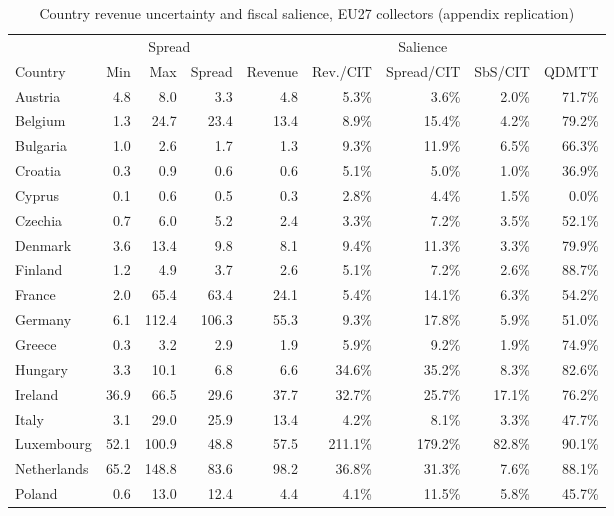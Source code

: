 \begin{table}[H]
\centering
\scriptsize
\setlength{\tabcolsep}{2pt}
\caption[Country revenue uncertainty and fiscal salience, EU27 collectors]{Country revenue uncertainty and fiscal salience, EU27 collectors (appendix replication)}
\label{tab:app_country_revenue_diagnostic}
\begin{adjustbox}{max width=\textwidth,center}
\begin{tabular}{@{}l rrr r rrrr@{}}
\toprule
 & \multicolumn{3}{c}{Spread} & \multicolumn{5}{c}{Salience} \\
\cmidrule(lr){2-4} \cmidrule(lr){5-9}
Country & Min & Max & Spread & Revenue & Rev./CIT & Spread/CIT & SbS/CIT & QDMTT \\
\midrule
Austria & 4.8 & 8.0 & 3.3 & 4.8 & 5.3\% & 3.6\% & 2.0\% & 71.7\% \\
Belgium & 1.3 & 24.7 & 23.4 & 13.4 & 8.9\% & 15.4\% & 4.2\% & 79.2\% \\
Bulgaria & 1.0 & 2.6 & 1.7 & 1.3 & 9.3\% & 11.9\% & 6.5\% & 66.3\% \\
Croatia & 0.3 & 0.9 & 0.6 & 0.6 & 5.1\% & 5.0\% & 1.0\% & 36.9\% \\
Cyprus & 0.1 & 0.6 & 0.5 & 0.3 & 2.8\% & 4.4\% & 1.5\% & 0.0\% \\
Czechia & 0.7 & 6.0 & 5.2 & 2.4 & 3.3\% & 7.2\% & 3.5\% & 52.1\% \\
Denmark & 3.6 & 13.4 & 9.8 & 8.1 & 9.4\% & 11.3\% & 3.3\% & 79.9\% \\
Finland & 1.2 & 4.9 & 3.7 & 2.6 & 5.1\% & 7.2\% & 2.6\% & 88.7\% \\
France & 2.0 & 65.4 & 63.4 & 24.1 & 5.4\% & 14.1\% & 6.3\% & 54.2\% \\
Germany & 6.1 & 112.4 & 106.3 & 55.3 & 9.3\% & 17.8\% & 5.9\% & 51.0\% \\
Greece & 0.3 & 3.2 & 2.9 & 1.9 & 5.9\% & 9.2\% & 1.9\% & 74.9\% \\
Hungary & 3.3 & 10.1 & 6.8 & 6.6 & 34.6\% & 35.2\% & 8.3\% & 82.6\% \\
Ireland & 36.9 & 66.5 & 29.6 & 37.7 & 32.7\% & 25.7\% & 17.1\% & 76.2\% \\
Italy & 3.1 & 29.0 & 25.9 & 13.4 & 4.2\% & 8.1\% & 3.3\% & 47.7\% \\
Luxembourg & 52.1 & 100.9 & 48.8 & 57.5 & 211.1\% & 179.2\% & 82.8\% & 90.1\% \\
Netherlands & 65.2 & 148.8 & 83.6 & 98.2 & 36.8\% & 31.3\% & 7.6\% & 88.1\% \\
Poland & 0.6 & 13.0 & 12.4 & 4.4 & 4.1\% & 11.5\% & 5.8\% & 45.7\% \\

\end{tabular}
\end{adjustbox}
\end{table}
